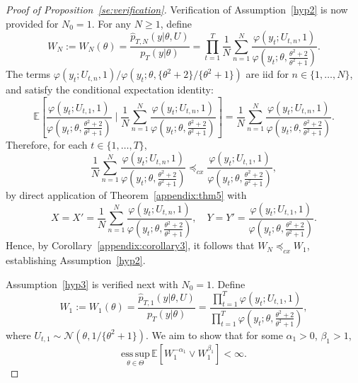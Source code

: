 \documentclass[pdflatex,sn-mathphys-num]{sn-jnl}
\newcommand{\E}{\mathbb{E}}
\renewcommand{\geq}{\geqslant}
\theoremstyle{thmstyleone}
\theoremstyle{thmstyletwo}
\theoremstyle{thmstylethree}
\begin{document}
\begin{proof}[Proof of Proposition~\ref{se:verification}]
Verification of Assumption~\ref{hyp2} is now provided for $N_0=1$. For any \( N \geq 1 \), define
\[
W_{N} := W_{N}(\theta) = \frac{\widehat p_{T,N}(y| \theta, U)}{p_{T}(y| \theta)}
= \prod_{t=1}^{T} \frac{1}{N} \sum_{n=1}^{N} 
\frac{\varphi(y_t ; U_{t,n}, 1)}{\varphi\left(y_t; \theta, \tfrac{\theta^2 + 2}{\theta^2 + 1} \right)}.
\]
The terms  \({\varphi(y_t ; U_{t,n}, 1)}/\varphi\left(y_t; \theta, \{\theta^2 + 2\}/\{\theta^2 + 1\} \right)\) are iid for \( n \in \{1, \dots, N\} \), and satisfy the conditional expectation identity:
\[
\E\left[ \frac{\varphi(y_t ; U_{t,1}, 1)}{\varphi\left(y_t; \theta, \tfrac{\theta^2 + 2}{\theta^2 + 1} \right)} 
\; \Bigg| \; \frac{1}{N} \sum_{n=1}^{N} \frac{\varphi(y_t ; U_{t,n}, 1)}{\varphi\left(y_t; \theta, \tfrac{\theta^2 + 2}{\theta^2 + 1} \right)} \right]
= \frac{1}{N} \sum_{n=1}^{N} \frac{\varphi(y_t ; U_{t,n}, 1)}{\varphi\left(y_t; \theta, \tfrac{\theta^2 + 2}{\theta^2 + 1} \right)}.
\]
Therefore, for each \( t \in \{1, \ldots, T\} \),
\[
\frac{1}{N} \sum_{n=1}^{N} \frac{\varphi(y_t ; U_{t,n}, 1)}{\varphi\left(y_t; \theta, \tfrac{\theta^2 + 2}{\theta^2 + 1} \right)} 
\preceq_{cx} \frac{\varphi(y_t ; U_{t,1}, 1)}{\varphi\left(y_t; \theta, \tfrac{\theta^2 + 2}{\theta^2 + 1} \right)},
\]
by direct application of Theorem~\ref{appendix:thm5} with
\[
X = X' = \frac{1}{N} \sum_{n=1}^{N} \frac{\varphi(y_t ; U_{t,n}, 1)}{\varphi\left(y_t; \theta, \tfrac{\theta^2 + 2}{\theta^2 + 1} \right)},
\quad 
Y = Y' = \frac{\varphi(y_t ; U_{t,1}, 1)}{\varphi\left(y_t; \theta, \tfrac{\theta^2 + 2}{\theta^2 + 1} \right)}.
\]
Hence, by Corollary~\ref{appendix:corollary3}, it follows that \( W_N \preceq_{cx} W_1 \), establishing Assumption~\ref{hyp2}.

Assumption~\ref{hyp3} is verified next with \( N_0 = 1 \). Define
\[
W_1 := W_1(\theta) = \frac{\widehat{p}_{T,1}(y|\theta, U)}{p_T(y|\theta)}
= \frac{\prod_{t=1}^T  \varphi\left(y_t; U_{t,1}, 1 \right)}{\prod_{t=1}^T \varphi\left(y_t; \theta, \tfrac{\theta^2 + 2}{\theta^2 + 1} \right)},
\]
where \( U_{t,1} \sim \mathcal{N}(\theta, {1}/\{\theta^2 + 1\}) \). We aim to show that for some \( \alpha_1 > 0 \), \( \beta_1 > 1 \),
\[
\underset{\theta \in \Theta}{\mathrm{ess\,sup}} \, \mathbb{E}[W_1^{-\alpha_1} \vee W_1^{\beta_1}] < \infty.
\]


\end{proof}
\end{document}
